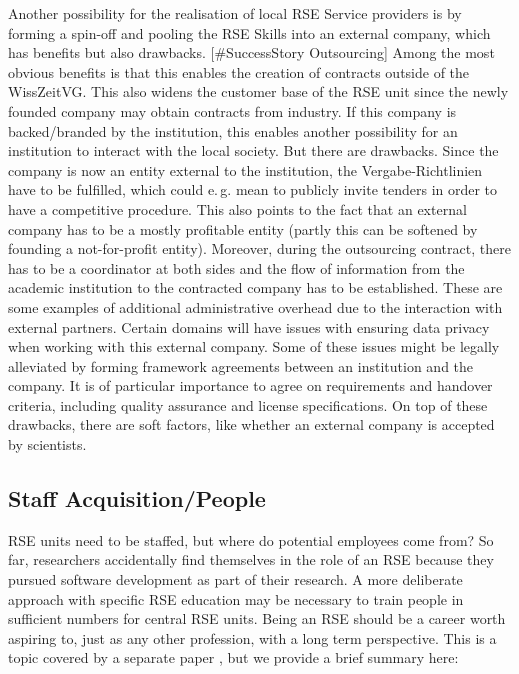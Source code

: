 \documentclass[a4paper]{article}
\makeatletter
\newcommand*{\eg}{e.\,g.\@\xspace}
\makeatother
\begin{document}
Another possibility for the realisation of local RSE Service providers is by forming a spin-off and pooling the RSE Skills into an external company, which has benefits but also drawbacks. [\#SuccessStory Outsourcing]
Among the most obvious benefits is that this enables the creation of contracts outside of the WissZeitVG.\@
This also widens the customer base of the RSE unit since the newly founded company may obtain contracts from industry.
If this company is backed/branded by the institution, this enables another possibility for an institution to interact with the local society.
But there are drawbacks.
Since the company is now an entity external to the institution, the Vergabe-Richtlinien have to be fulfilled, which could \eg{} mean to publicly invite tenders in order to have a competitive procedure.
This also points to the fact that an external company has to be a mostly profitable entity (partly this can be softened by founding a not-for-profit entity).
Moreover, during the outsourcing contract, there has to be a coordinator at both sides and the flow of information from the academic institution to the contracted company has to be established.
These are some examples of additional administrative overhead due to the interaction with external partners.
Certain domains will have issues with ensuring data privacy when working with this external company.
Some of these issues might be legally alleviated by forming framework agreements between an institution and the company.
It is of particular importance to agree on requirements and handover criteria, including quality assurance and license specifications.
On top of these drawbacks, there are soft factors, like whether an external company is accepted by scientists.

\subsection{Staff Acquisition/People}

RSE units need to be staffed, but where do potential employees come from?
So far, researchers accidentally find themselves in the role of an RSE because they pursued software development as part of their research.
A more deliberate approach with specific RSE education may be necessary to train people in sufficient numbers for central RSE units.
Being an RSE should be a career worth aspiring to, just as any other profession, with a long term perspective.
This is a topic covered by a separate paper \autocite{goth_foundational_competencies_2024}, but we provide a brief summary here:
\end{document}
